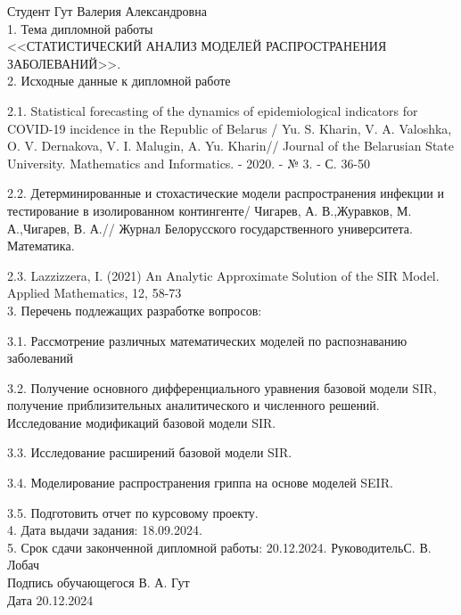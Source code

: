 \documentclass[a4paper, 14pt]{extreport}
\begin{document}
	\small{    Студент \quad Гут Валерия Александровна\\[2mm]
		1. Тема дипломной работы\\
		<<СТАТИСТИЧЕСКИЙ АНАЛИЗ МОДЕЛЕЙ РАСПРОСТРАНЕНИЯ ЗАБОЛЕВАНИЙ>>.\\[6mm]
		2. Исходные данные к дипломной работе
		
		2.1. Statistical forecasting of the dynamics of epidemiological indicators for COVID-19 incidence in the Republic of Belarus / Yu. S. Kharin, V. A. Valoshka, O. V. Dernakova, V. I. Malugin, A. Yu. Kharin// Journal of the Belarusian State University. Mathematics and Informatics. - 2020. - № 3. - С. 36-50
		
		2.2. Детерминированные и стохастические модели распространения инфекции и тестирование в изолированном контингенте/ Чигарев, А. В.,Журавков, М. А.,Чигарев, В. А.// Журнал Белорусского государственного университета. Математика.
		
		2.3. Lazzizzera, I. (2021) An Analytic Approximate Solution of the SIR Model. Applied Mathematics, 12, 58-73\\[2mm]
		
		3. Перечень подлежащих разработке вопросов:
		
		3.1. Рассмотрение различных математических моделей по распознаванию  заболеваний
		
		3.2. Получение основного дифференциального уравнения базовой модели SIR, получение приблизительных аналитического и численного решений. Исследование модификаций базовой модели SIR.
		
		3.3. Исследование расширений базовой модели SIR.
		
		3.4. Моделирование распространения гриппа на основе моделей SEIR.
		
		3.5. Подготовить отчет по курсовому проекту.\\[1cm]
		4. Дата выдачи задания: 18.09.2024.\\[6mm]
		5. Срок сдачи законченной дипломной работы: 20.12.2024.
		\vfill
		\noindent Руководитель\hspace*{3cm}\underline{\hspace*{4cm}}\hspace*{4cm}С. В. Лобач\\[2mm]
		\noindent Подпись обучающегося\hspace*{1.21cm}\underline{\hspace*{4cm}} \hspace*{3.7cm} В. А. Гут\\[2mm]
		Дата \hspace*{12.5cm}20.12.2024     
	}\normalsize
	\newpage
	
\end{document}
